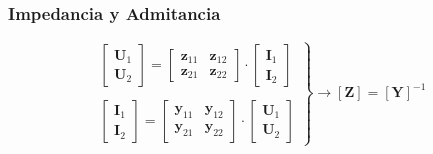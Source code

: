 \subsubsection{Impedancia y Admitancia}
\label{sec:orgf5948b7}
\[
  \left.
    \begin{array}{l}
      \left[
      \begin{array}{c}
        \mathbf{U}_1\\
        \mathbf{U}_2
      \end{array}
      \right] =
      \left[
      \begin{array}{cc}
        \mathbf{z}_{11} & \mathbf{z}_{12}\\
        \mathbf{z}_{21} & \mathbf{z}_{22}
      \end{array}
                          \right]
                          \cdot
                          \left[
                          \begin{array}{c}
                            \mathbf{I}_1\\
                            \mathbf{I}_2
                          \end{array}
      \right] \\ \\
      \left[
      \begin{array}{c}
        \mathbf{I}_1\\
        \mathbf{I}_2
      \end{array}
      \right] =
      \left[
      \begin{array}{cc}
        \mathbf{y}_{11} & \mathbf{y}_{12}\\
        \mathbf{y}_{21} & \mathbf{y}_{22}
      \end{array}
                          \right] \cdot
                          \left[
                          \begin{array}{c}
                            \mathbf{U}_1\\
                            \mathbf{U}_2
                          \end{array}
      \right]
    \end{array}
    \right\}
      \rightarrow
      \boxed{[\mathbf{Z}] = [\mathbf{Y}]^{-1}}
    \]

